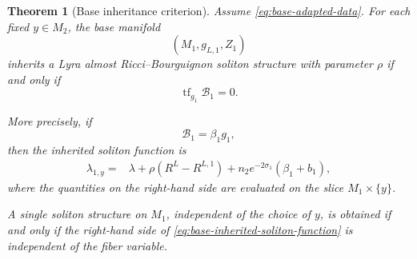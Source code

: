 \documentclass[a4paper,11pt]{article}
\theoremstyle{plain}
\newtheorem{theorem}{Theorem}[section]
\numberwithin{equation}{section}
\begin{document}
\begin{theorem}[Base inheritance criterion]
	\label{thm:base-inheritance}
	Assume \eqref{eq:base-adapted-data}. For each fixed
	\(y\in M_{2}\), the base manifold
	\[
	\left(
	M_{1},
	g_{L,1},
	Z_{1}
	\right)
	\]
	inherits a Lyra almost Ricci--Bourguignon soliton structure with
	parameter \(\rho\) if and only if
	\begin{equation}
		\operatorname{tf}_{g_{1}}\mathcal B_{1}
		=
		0.
		\label{eq:base-inheritance-condition}
	\end{equation}
	
	More precisely, if
	\begin{equation}
		\mathcal B_{1}
		=
		\beta_{1}g_{1},
		\label{eq:base-inheritance-beta}
	\end{equation}
	then the inherited soliton function is
	\begin{align}
		\lambda_{1,y}
		={}&
		\lambda
		+
		\rho
		\left(
		R^{L}-R^{L,1}
		\right)
		+
		n_{2}e^{-2\sigma_{1}}
		\left(
		\beta_{1}+b_{1}
		\right),
		\label{eq:base-inherited-soliton-function}
	\end{align}
	where the quantities on the right-hand side are evaluated on
	the slice \(M_{1}\times\{y\}\).
	
	A single soliton structure on \(M_{1}\), independent of the
	choice of \(y\), is obtained if and only if the right-hand side
	of \eqref{eq:base-inherited-soliton-function} is independent of
	the fiber variable.
\end{theorem}
\end{document}
